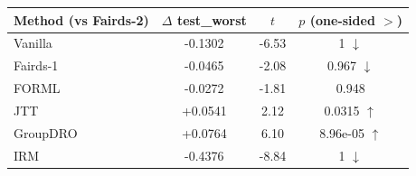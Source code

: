\begin{tabular}{lccc}
\toprule
Method (vs Fairds-2) & $\Delta$ test\_worst & $t$ & $p$ (one-sided $>$) \\
\midrule
Vanilla & -0.1302 & -6.53 & 1 $\downarrow$ \\
Fairds-1 & -0.0465 & -2.08 & 0.967 $\downarrow$ \\
FORML & -0.0272 & -1.81 & 0.948 \\
JTT & +0.0541 & 2.12 & 0.0315 $\uparrow$ \\
GroupDRO & +0.0764 & 6.10 & 8.96e-05 $\uparrow$ \\
IRM & -0.4376 & -8.84 & 1 $\downarrow$ \\
\bottomrule
\end{tabular}